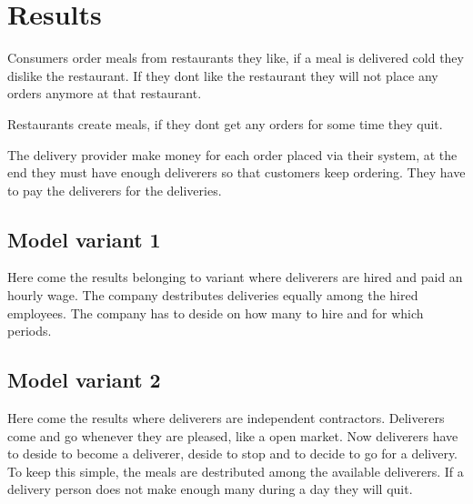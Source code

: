 \section{Results}


Consumers order meals from restaurants they like, if a meal is delivered cold they dislike the restaurant.
If they dont like the restaurant they will not place any orders anymore at that restaurant.

Restaurants create meals, if they dont get any orders for some time they quit.

The delivery provider make money for each order placed via their system, at the end they must have enough deliverers so that
customers keep ordering.
They have to pay the deliverers for the deliveries.



\subsection{Model variant 1}
Here come the results belonging to variant where deliverers are hired and paid an hourly wage.
The company destributes deliveries equally among the hired employees.
The company has to deside on how many to hire and for which periods.


\subsection{Model variant 2}
Here come the results where deliverers are independent contractors.
Deliverers come and go whenever they are pleased, like a open market.
Now deliverers have to deside to become a deliverer, deside to stop and to decide to go for a delivery.
To keep this simple, the meals are destributed among the available deliverers.
If a delivery person does not make enough many during a day they will quit.
